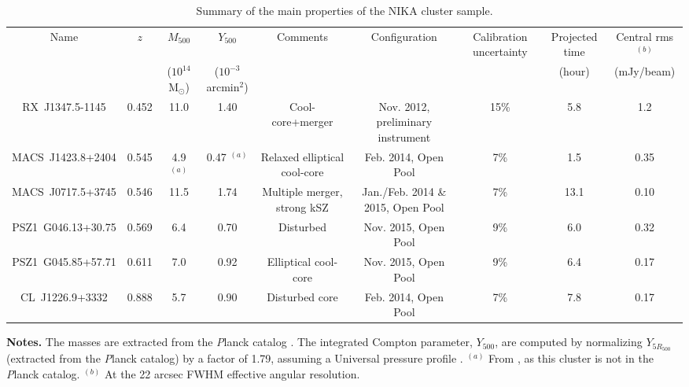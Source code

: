 \documentclass[twocolumn,traditabstract]{aa}
\begin{document}
\begin{table}[]
\caption{\footnotesize{Summary of the main properties of the NIKA cluster sample.}}
\begin{center}
\resizebox{\textwidth}{!} {
\begin{tabular}{c|c|c|c|c||c|c|c|c}
\hline
\hline
Name & $z$ & $M_{500}$ & $Y_{500}$ & Comments & Configuration & Calibration uncertainty & Projected time & Central rms$^{(b)}$ \\
 &  & ($10^{14}$ M$_{\odot}$)& ($10^{-3}$arcmin$^2$) & & & & (hour) & (mJy/beam) \\
\hline
RX~J1347.5-1145 & 0.452 & 11.0 & 1.40 & Cool-core+merger & Nov. 2012, preliminary instrument & 15\% & 5.8 & 1.2 \\ 
MACS~J1423.8+2404 & 0.545 & 4.9 $^{(a)}$ & 0.47 $^{(a)}$ & Relaxed elliptical cool-core & Feb. 2014, Open Pool & 7\% &1.5 & 0.35 \\ 
MACS~J0717.5+3745 & 0.546 & 11.5 & 1.74 & Multiple merger, strong kSZ & Jan./Feb. 2014 \& 2015, Open Pool & 7\% & 13.1 & 0.10 \\ 
PSZ1~G046.13+30.75 & 0.569 & 6.4 & 0.70 & Disturbed & Nov. 2015, Open Pool & 9\% & 6.0 &  0.32\\ 
PSZ1~G045.85+57.71 & 0.611 & 7.0 & 0.92 & Elliptical cool-core & Nov. 2015, Open Pool & 9\% & 6.4 & 0.17 \\ 
CL~J1226.9+3332 &  0.888 & 5.7 & 0.90 & Disturbed core & Feb. 2014, Open Pool & 7\% & 7.8 & 0.17 \\ 
\hline
\end{tabular}
}
\end{center}
{\small {\bf Notes.} The masses are extracted from the {\textit Planck} catalog \citep{PlanckXXVII2015}. The integrated Compton parameter, $Y_{500}$, are computed by normalizing $Y_{5R_{500}}$ (extracted from the {\textit Planck} catalog) by a factor of 1.79, assuming a Universal pressure profile \citep{Arnaud2010}. $^{(a)}$ From \cite{Adam2016a}, as this cluster is not in the {\textit Planck} catalog. $^{(b)}$ At the 22 arcsec FWHM effective angular resolution.}
\label{tab:cluster_summary}
\end{table}
\end{document}
